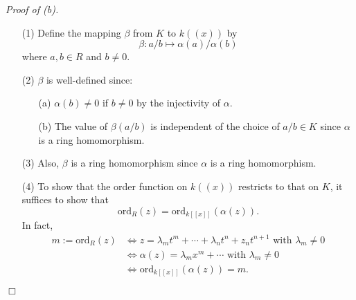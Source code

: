 \documentclass{article}
\begin{document}
\emph{Proof of (b).}
\begin{enumerate}
\item[(1)]
  Define the mapping $\beta$ from $K$ to $k((x))$
  by
  \[
    \beta: a/b \mapsto \alpha(a)/\alpha(b)
  \]
  where $a, b \in R$ and $b \neq 0$.

\item[(2)]
  $\beta$ is well-defined since:
  \begin{enumerate}
  \item[(a)]
    $\alpha(b) \neq 0$ if $b \neq 0$ by the injectivity of $\alpha$.

  \item[(b)]
    The value of $\beta(a/b)$ is independent of the choice of $a/b \in K$
    since $\alpha$ is a ring homomorphism.
  \end{enumerate}

\item[(3)]
  Also, $\beta$ is a ring homomorphism since $\alpha$ is a ring homomorphism.

\item[(4)]
  To show that the order function on $k((x))$ restricts to that on $K$,
  it suffices to show that
  \[
    \mathrm{ord}_{R}(z) = \mathrm{ord}_{k[[x]]}(\alpha(z)).
  \]
  In fact,
  \begin{align*}
    m := \mathrm{ord}_{R}(z)
    &\Longleftrightarrow
    z = \lambda_m t^m + \cdots + \lambda_n t^n + z_n t^{n+1} \text{ with } \lambda_m \neq 0 \\
    &\Longleftrightarrow
    \alpha(z) = \lambda_m x^m + \cdots \text{ with } \lambda_m \neq 0 \\
    &\Longleftrightarrow
    \mathrm{ord}_{k[[x]]}(\alpha(z)) = m.
  \end{align*}
\end{enumerate}
$\Box$ \\
\end{document}
